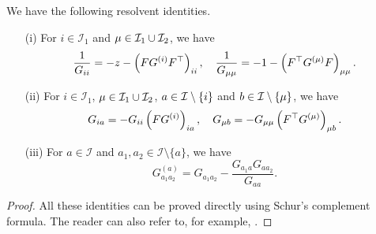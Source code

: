 \begin{lemma}\label{lemm_resolvent}
We have the following resolvent identities.
\begin{itemize}
\item[(i)]
For $i\in \mathcal I_1$ and $\mu\in \mathcal I_1\cup \cal I_2$, we have
\begin{equation}
\frac{1}{G_{ii}} =  - z - \left( {\AF G^{\left( i \right)} \AF^\top} \right)_{ii} ,\quad  \frac{1}{{G_{\mu \mu } }} =  - 1  - \left( {\AF^\top  G^{\left( \mu  \right)} \AF} \right)_{\mu \mu }.\label{resolvent2}
\end{equation}

 \item[(ii)]
 For $i\in \mathcal I_1$, $\mu \in \mathcal I_1\cup \cal I_2$, $a\in \cal I\setminus \{i\}$ and $b\in \cal I\setminus \{ \mu\}$, we have
\begin{equation}
G_{ia}   = -G_{ii}  \left( \AF G^{\left( {i} \right)} \right)_{ia},\quad  G_{\mu b }  = - G_{\mu \mu }  \left( \AF^\top  G^{\left( {\mu } \right)}  \right)_{\mu b }. \label{resolvent3}
\end{equation}

 \item[(iii)]
 For $a \in \mathcal I$ and $a_1,a_2 \in \mathcal I \setminus \{a\}$, we have
\begin{equation}
G_{a_1a_2}^{\left( a \right)}  = G_{a_1a_2}  - \frac{G_{a_1a} G_{aa_2}}{G_{aa}} .
\label{resolvent8}
\end{equation}
\end{itemize}
\end{lemma}
\begin{proof}
All these identities can be proved directly using Schur's complement formula. The reader can also refer to, for example, \cite[Lemma 4.4]{Anisotropic}.
\end{proof}


